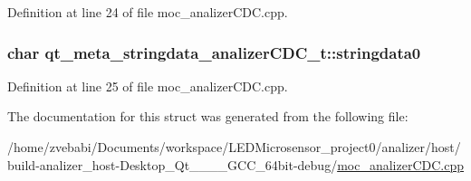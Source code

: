 Definition at line 24 of file moc\+\_\+analizer\+C\+D\+C.\+cpp.

\hypertarget{structqt__meta__stringdata__analizer_c_d_c__t_a6c9dec6a6c7ed93e847c04d01fca28d0}{
\subsubsection[{stringdata0}]{\setlength{\rightskip}{0pt plus 5cm}char qt\+\_\+meta\+\_\+stringdata\+\_\+analizer\+C\+D\+C\+\_\+t\+::stringdata0}}\label{structqt__meta__stringdata__analizer_c_d_c__t_a6c9dec6a6c7ed93e847c04d01fca28d0}


Definition at line 25 of file moc\+\_\+analizer\+C\+D\+C.\+cpp.



The documentation for this struct was generated from the following file\+:\begin{DoxyCompactItemize}
\item 
/home/zvebabi/\+Documents/workspace/\+L\+E\+D\+Microsensor\+\_\+project0/analizer/host/build-\/analizer\+\_\+host-\/\+Desktop\+\_\+\+Qt\+\_\+\_\+\_\+\_\+\+G\+C\+C\+\_\+64bit-\/debug/\hyperlink{build-analizer__host-_desktop___qt__5__9__0___g_c_c__64bit-debug_2moc__analizer_c_d_c_8cpp}{moc\+\_\+analizer\+C\+D\+C.\+cpp}\end{DoxyCompactItemize}

